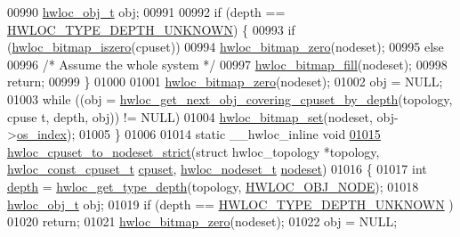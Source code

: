 \begin{DoxyCode}
00990         \hyperlink{a00016}{hwloc_obj_t} obj;
00991 
00992         \textcolor{keywordflow}{if} (depth == \hyperlink{a00046_ggaf4e663cf42bbe20756b849c6293ef575a0565ab92ab72cb0cec91e23003294aad}{HWLOC_TYPE_DEPTH_UNKNOWN}) \{
00993                  \textcolor{keywordflow}{if} (\hyperlink{a00065_gaa94fed35d2a598bc4a8657b6955b7bf5}{hwloc_bitmap_iszero}(cpuset))
00994                         \hyperlink{a00065_ga6c540b9fe63b8223b6aba46d56dd63b8}{hwloc_bitmap_zero}(nodeset);
00995                 \textcolor{keywordflow}{else}
00996                         \textcolor{comment}{/* Assume the whole system */}
00997                         \hyperlink{a00065_ga52456f7ef79d68e610cb65e3f7ffafad}{hwloc_bitmap_fill}(nodeset);
00998                 \textcolor{keywordflow}{return};
00999         \}
01000 
01001         \hyperlink{a00065_ga6c540b9fe63b8223b6aba46d56dd63b8}{hwloc_bitmap_zero}(nodeset);
01002         obj = NULL;
01003         \textcolor{keywordflow}{while} ((obj = \hyperlink{a00056_ga2f9a4ec15e9cfae8c21501257a51ce5b}{hwloc_get_next_obj_covering_cpuset_by_depth}(topology, cpuse
      t, depth, obj)) != NULL)
01004                 \hyperlink{a00065_ga497556af0cc34f109ae0277999c074d3}{hwloc_bitmap_set}(nodeset, obj->\hyperlink{a00016_a61a7a80a68eaccbaaa28269e678c81a9}{os_index});
01005 \}
01006 
01014 \textcolor{keyword}{static} \_\_hwloc\_inline \textcolor{keywordtype}{void}
\hypertarget{a00031_source_l01015}{}\hyperlink{a00062_ga9162785e39d7c697f76f99524c4a2fb4}{01015} \hyperlink{a00062_ga9162785e39d7c697f76f99524c4a2fb4}{hwloc_cpuset_to_nodeset_strict}(\textcolor{keyword}{struct} hwloc\_topology *topology, 
      \hyperlink{a00040_ga1f784433e9b606261f62d1134f6a3b25}{hwloc_const_cpuset_t} \hyperlink{a00016_a67925e0f2c47f50408fbdb9bddd0790f}{cpuset}, \hyperlink{a00040_ga37e35730fa7e775b5bb0afe893d6d508}{hwloc_nodeset_t} \hyperlink{a00016_a08f0d0e16c619a6e653526cbee4ffea3}{nodeset})
01016 \{
01017         \textcolor{keywordtype}{int} \hyperlink{a00016_a9d82690370275d42d652eccdea5d3ee5}{depth} = \hyperlink{a00046_gaea7c64dd59467f5201ba87712710b14d}{hwloc_get_type_depth}(topology, \hyperlink{a00041_ggacd37bb612667dc437d66bfb175a8dc55aaf0964881117bdedf1a5e9332cd120dd}{HWLOC_OBJ_NODE});
01018         \hyperlink{a00016}{hwloc_obj_t} obj;
01019         \textcolor{keywordflow}{if} (depth == \hyperlink{a00046_ggaf4e663cf42bbe20756b849c6293ef575a0565ab92ab72cb0cec91e23003294aad}{HWLOC_TYPE_DEPTH_UNKNOWN} )
01020                 \textcolor{keywordflow}{return};
01021         \hyperlink{a00065_ga6c540b9fe63b8223b6aba46d56dd63b8}{hwloc_bitmap_zero}(nodeset);
01022         obj = NULL;

\end{DoxyCode}
